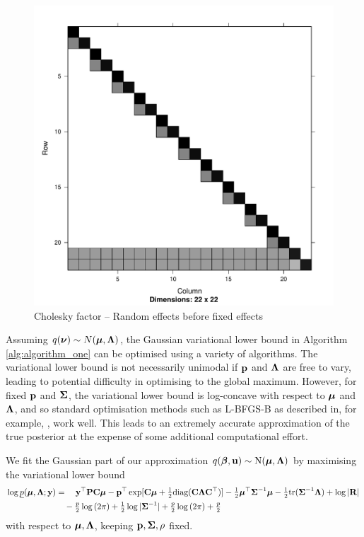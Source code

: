 \documentclass[times, doublespace]{anzsauth}
\begin{document}
	\begin{figure}[p]
		\caption{\tiny Cholesky factor -- Random effects before fixed effects}
		\label{fig:cholrandomfixed}
		\includegraphics[scale=.25]{mZ_mX_cholesky.pdf}
	\end{figure}
	
	\noindent Assuming $q({\boldsymbol \nu}) \sim N({\boldsymbol \mu}, {\boldsymbol \Lambda})$, the Gaussian variational lower bound in Algorithm
	\ref{alg:algorithm_one} can be optimised using a variety of algorithms. The variational lower bound is not
	necessarily unimodal if ${\bf p}$ and ${\boldsymbol \Lambda}$ are free to vary, leading to potential difficulty in optimising
	to the global maximum. However, for fixed ${\bf p}$ and ${\boldsymbol \Sigma}$, the variational lower bound is log-concave
	with respect to ${\boldsymbol \mu}$ and ${\boldsymbol \Lambda}$, and so standard optimisation methods such as L-BFGS-B as described
	in, for example, \cite{Liu1989}, work well. This leads to an extremely accurate approximation of the true
	posterior at the expense of some additional computational effort.
		
	\noindent We fit the Gaussian part of our approximation $q({\boldsymbol \beta}, {\bf u}) \sim \text{N}({\boldsymbol \mu}, {\boldsymbol \Lambda})$ by maximising 
	the variational lower bound	
	\begin{align*}
		\log \underline{p}({\boldsymbol \mu}, {\boldsymbol \Lambda}; {\bf y}) & = \quad {\bf y}^\top{\bf P} {\bf C} {\boldsymbol\mu} - {\bf p}^\top \exp[{\bf C} {\boldsymbol \mu} + \tfrac{1}{2} \text{diag}({\bf C} {\boldsymbol \Lambda} {\bf C}^\top)] - \tfrac{1}{2} {\boldsymbol \mu}^\top {\boldsymbol\Sigma}^{-1} {\boldsymbol \mu} - \tfrac{1}{2} \text{tr}{({\boldsymbol\Sigma}^{-1} {\boldsymbol\Lambda})} + \log{|{\bf R}|} \\
		                                        & \quad - \tfrac{p}{2} \log{(2 \pi)} + \tfrac{1}{2} \log{|{\boldsymbol\Sigma}^{-1}|} + \tfrac{p}{2} \log{(2 \pi)} + \tfrac{p}{2}                                                                              \\
	\end{align*}
	\noindent with respect to ${\boldsymbol \mu}, {\boldsymbol \Lambda}$, keeping ${\bf p}, {\boldsymbol \Sigma}, \rho$ fixed.
		
\end{document}
